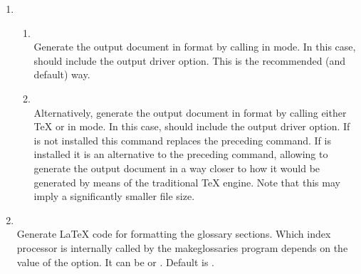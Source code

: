 \begin{enumerate}

   \item
   \begin{enumerate}
      \item
         \label{item:pdf_mode}
          \\
         Generate the output document in  format by calling
         \pdfTeX{} in  mode.  In this case,
         \latexcmd{\documentclass} should include the 
         output driver option. This is the recommended (and default) way.
      \item
         \label{item:dvi_mode}
          \\
         Alternatively, generate the output document in  format by calling either \TeX{} or \pdfTeX{} in  mode.
         In this case, \latexcmd{\documentclass} should include the  output driver option.
         If \pdfTeX{} is not installed this command replaces the preceding command.
         If \pdfTeX{} is installed it is an alternative to the preceding command, allowing to generate the output document in a way
         closer to how it would be generated by means of the traditional \TeX{} engine.
         Note that this may imply a significantly smaller  file size.
   \end{enumerate}

   \item
      \label{item:glossaries}
       \\
      Generate \LaTeX{} code for formatting the glossary sections. Which
      index processor is internally called by the makeglossaries program
      depends on the value of the 
      \latexcmd{\documentclass} option.  It can be  or
      . Default is .


\end{enumerate}
